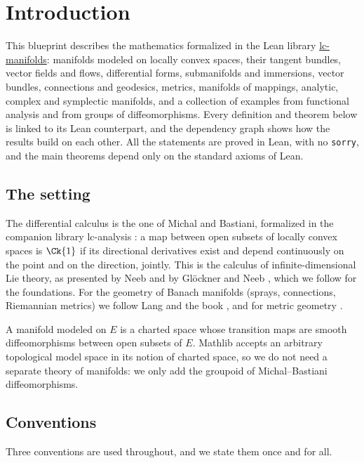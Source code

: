 \chapter{Introduction}
\label{chap:introduction}

This blueprint describes the mathematics formalized in the Lean library
\href{https://github.com/glaroton/lc-manifolds}{lc-manifolds}: manifolds modeled on locally convex
spaces, their tangent bundles, vector fields and flows, differential forms, submanifolds and
immersions, vector bundles, connections and geodesics, metrics, manifolds of mappings, analytic,
complex and symplectic manifolds, and a collection of examples from functional analysis and from
groups of diffeomorphisms. Every definition and
theorem below is linked to its Lean counterpart, and the dependency graph shows how the results
build on each other. All the statements are proved in Lean, with no \texttt{sorry}, and the main
theorems depend only on the standard axioms of Lean.

\section*{The setting}

The differential calculus is the one of Michal and Bastiani, formalized in the companion library
lc-analysis \cite{LCA}: a map between open subsets of locally convex spaces is $\Ck{1}$ if its
directional derivatives exist and depend continuously on the point and on the direction, jointly.
This is the calculus of infinite-dimensional Lie theory, as presented by Neeb \cite{Nee06} and by
Glöckner and Neeb \cite{GN26}, which we follow for the foundations. For the geometry of Banach
manifolds (sprays, connections, Riemannian metrics) we follow Lang \cite{Lan99} and the book
\cite{Lar26}, and for metric geometry \cite{Lar19}.

A manifold modeled on $E$ is a charted space whose transition maps are smooth diffeomorphisms
between open subsets of $E$. Mathlib \cite{mC20} accepts an arbitrary topological model space in
its notion of charted space, so we do not need a separate theory of manifolds: we only add the
groupoid of Michal--Bastiani diffeomorphisms.

\section*{Conventions}

Three conventions are used throughout, and we state them once and for all.

